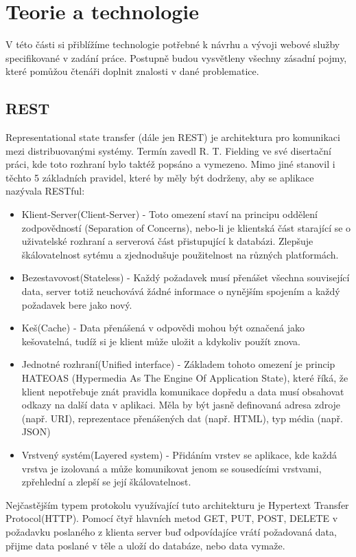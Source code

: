    
  \chapter{Teorie a technologie}
  V této části si přiblížíme technologie potřebné k návrhu a vývoji webové služby specifikované v zadání práce. Postupně budou vysvětleny všechny zásadní pojmy, které pomůžou čtenáři doplnit znalosti v dané problematice.
  
  \section{REST}
	Representational state transfer (dále jen REST) je architektura pro komunikaci  mezi distribuovanými systémy. Termín zavedl R. T. Fielding ve své disertační práci\cite{restThesis}, kde toto rozhraní bylo taktéž popsáno a vymezeno. Mimo jiné stanovil i těchto 5 základních pravidel, které by měly být dodrženy, aby se aplikace nazývala RESTful\cite{rest}:
	\begin{itemize}
		\item Klient-Server(Client-Server) - Toto omezení staví na principu oddělení zodpovědností (Separation of Concerns), nebo-li je klientská část starající se o uživatelské rozhraní a serverová část přistupující k databázi. Zlepšuje škálovatelnost sytému a zjednodušuje použitelnost na různých platformách.
		\item Bezestavovost(Stateless) - Každý požadavek musí přenášet všechna související data, server totiž neuchovává žádné informace o nynějším spojením a každý požadavek bere jako nový.
		\item Keš(Cache) - Data přenášená v odpovědi mohou být označená jako kešovatelná, tudíž si je klient může uložit a kdykoliv použít znova.
		\item Jednotné rozhraní(Unified interface) - Základem tohoto omezení je princip HATEOAS (Hypermedia As The Engine Of Application State), které říká, že klient nepotřebuje znát pravidla komunikace dopředu a data musí obsahovat odkazy na další data v aplikaci. Měla by být jasně definovaná adresa zdroje (např. URI), reprezentace přenášených dat (např. HTML), typ média (např. JSON)
		\item Vrstvený systém(Layered system) - Přidáním vrstev se aplikace, kde každá vrstva je izolovaná a může komunikovat jenom se sousedícími vrstvami, zpřehlední a zlepší se její škálovatelnost.
	\end{itemize}	
	Nejčastějším typem protokolu využívající tuto architekturu je Hypertext Transfer Protocol(HTTP). Pomocí čtyř hlavních metod GET, PUT, POST, DELETE v požadavku poslaného z klienta server buď odpovídajíce vrátí požadovaná data, přijme data poslané v těle a uloží do databáze, nebo data vymaže. 

